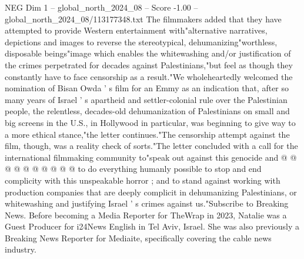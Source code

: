 \begin{textsample}{NEG Dim 1 – global\_north\_2024\_08 – Score -1.00 – global\_north\_2024\_08/113177348.txt}
The filmmakers added that they have attempted to provide Western entertainment with"alternative narratives, depictions and images to reverse the stereotypical, dehumanizing"worthless, disposable beings"image which enables the whitewashing and/or justification of the crimes perpetrated for decades against Palestinians,"but feel as though they constantly have to face censorship as a result."We wholeheartedly welcomed the nomination of Bisan Owda ' s film for an Emmy as an indication that, after so many years of Israel ' s apartheid and settler-colonial rule over the Palestinian people, the relentless, decades-old dehumanization of Palestinians on small and big screens in the U.S., in Hollywood in particular, was beginning to give way to a more ethical stance,"the letter continues."The censorship attempt against the film, though, was a reality check of sorts."The letter concluded with a call for the international filmmaking community to"speak out against this genocide and @ @ @ @ @ @ @ @ @ @ to do everything humanly possible to stop and end complicity with this unspeakable horror ; and to stand against working with production companies that are deeply complicit in dehumanizing Palestinians, or whitewashing and justifying Israel ' s crimes against us."Subscribe to Breaking News.
Before becoming a Media Reporter for TheWrap in 2023, Natalie was a Guest Producer for i24News English in Tel Aviv, Israel.
She was also previously a Breaking News Reporter for Mediaite, specifically covering the cable news industry.

\end{textsample}
